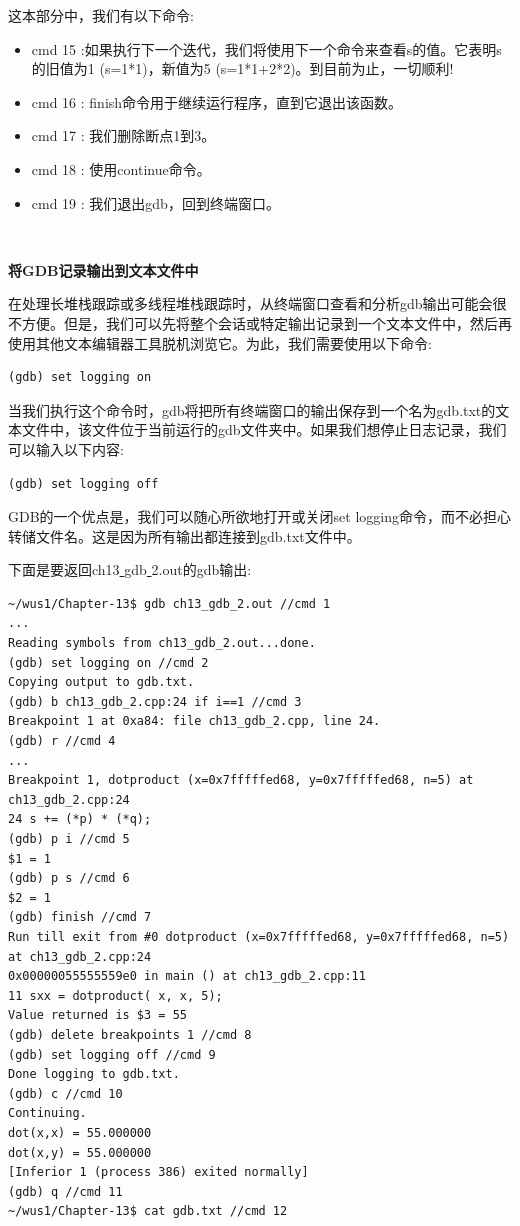 这本部分中，我们有以下命令: \par

\begin{itemize}
	\item cmd 15 :如果执行下一个迭代，我们将使用下一个命令来查看s的值。它表明s的旧值为1 (s=1*1)，新值为5 (s=1*1+2*2)。到目前为止，一切顺利!
	\item cmd 16 : finish命令用于继续运行程序，直到它退出该函数。
	\item cmd 17 : 我们删除断点1到3。
	\item cmd 18 : 使用continue命令。
	\item cmd 19 : 我们退出gdb，回到终端窗口。
\end{itemize}

\noindent\textbf{}\ \par
\textbf{将GDB记录输出到文本文件中} \ \par
在处理长堆栈跟踪或多线程堆栈跟踪时，从终端窗口查看和分析gdb输出可能会很不方便。但是，我们可以先将整个会话或特定输出记录到一个文本文件中，然后再使用其他文本编辑器工具脱机浏览它。为此，我们需要使用以下命令: \par
\begin{lstlisting}[caption={}]
(gdb) set logging on
\end{lstlisting}

当我们执行这个命令时，gdb将把所有终端窗口的输出保存到一个名为gdb.txt的文本文件中，该文件位于当前运行的gdb文件夹中。如果我们想停止日志记录，我们可以输入以下内容: \par

\begin{lstlisting}[caption={}]
(gdb) set logging off
\end{lstlisting}

GDB的一个优点是，我们可以随心所欲地打开或关闭set logging命令，而不必担心转储文件名。这是因为所有输出都连接到gdb.txt文件中。 \par
下面是要返回ch13\underline{ }gdb\underline{ }2.out的gdb输出: \par

\begin{lstlisting}[caption={}]
~/wus1/Chapter-13$ gdb ch13_gdb_2.out //cmd 1
...
Reading symbols from ch13_gdb_2.out...done.
(gdb) set logging on //cmd 2
Copying output to gdb.txt.
(gdb) b ch13_gdb_2.cpp:24 if i==1 //cmd 3
Breakpoint 1 at 0xa84: file ch13_gdb_2.cpp, line 24.
(gdb) r //cmd 4
...
Breakpoint 1, dotproduct (x=0x7fffffed68, y=0x7fffffed68, n=5) at ch13_gdb_2.cpp:24
24 s += (*p) * (*q);
(gdb) p i //cmd 5
$1 = 1
(gdb) p s //cmd 6
$2 = 1
(gdb) finish //cmd 7
Run till exit from #0 dotproduct (x=0x7fffffed68, y=0x7fffffed68, n=5) at ch13_gdb_2.cpp:24
0x00000055555559e0 in main () at ch13_gdb_2.cpp:11
11 sxx = dotproduct( x, x, 5);
Value returned is $3 = 55
(gdb) delete breakpoints 1 //cmd 8
(gdb) set logging off //cmd 9
Done logging to gdb.txt.
(gdb) c //cmd 10
Continuing.
dot(x,x) = 55.000000
dot(x,y) = 55.000000
[Inferior 1 (process 386) exited normally]
(gdb) q //cmd 11
~/wus1/Chapter-13$ cat gdb.txt //cmd 12
\end{lstlisting}

